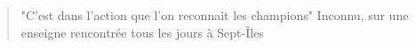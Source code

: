 \thispagestyle{empty}

\begin{minipage}[l]{0.45\textwidth}

\end{minipage}%
\hfill
\begin{minipage}[r]{0.5\textwidth}
\begin{quotation}
\begin{doublespace}

"C'est dans l'action que l'on reconnait les champions"
Inconnu, sur une enseigne rencontrée tous les jours à Sept-Îles

\end{doublespace}
\end{quotation}
\end{minipage}%

\cleardoublepage

